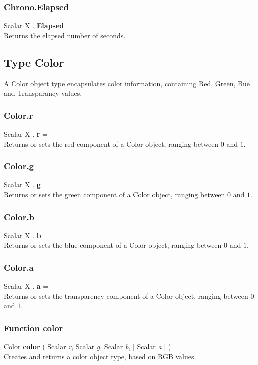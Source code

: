 \subsubsection{Chrono.Elapsed \label{F:Chrono:Elapsed}}
Scalar X . \textbf{Elapsed} \\
Returns the elapsed number of seconds.

\subsection{Type Color \label{T:Color}}
A Color object type encapsulates color information, containing Red, Green, Bue and Transparancy values.

\subsubsection{Color.r \label{F:Color:r}}
Scalar X . \textbf{r} = \\
Returns or sets the red component of a Color object, ranging between $0$ and $1$.

\subsubsection{Color.g \label{F:Color:g}}
Scalar X . \textbf{g} = \\
Returns or sets the green component of a Color object, ranging between $0$ and $1$.


\subsubsection{Color.b \label{F:Color:b}}
Scalar X . \textbf{b} = \\
Returns or sets the blue component of a Color object, ranging between $0$ and $1$.


\subsubsection{Color.a \label{F:Color:a}}
Scalar X . \textbf{a} = \\
Returns or sets the transparency component of a Color object, ranging between $0$ and $1$.


\subsubsection{Function color \label{F:color}}
Color \textbf{color} ( Scalar \textit{r}, Scalar \textit{g}, Scalar \textit{b},  [ Scalar \textit{a} ] ) \\
Creates and returns a color object type, based on RGB values.

